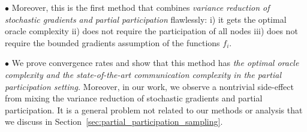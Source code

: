 \documentclass{article}
\begin{document}
$\bullet$ Moreover, this is the first method that combines \textit{variance reduction of stochastic gradients and partial participation} flawlessly: i) it gets the optimal oracle complexity ii) does not require the participation of all nodes iii) does not require the bounded gradients assumption of the functions $f_i$.

$\bullet$ We prove convergence rates and show that this method has \textit{the optimal oracle complexity and the state-of-the-art communication complexity in the partial participation setting.} Moreover, in our work, we observe a nontrivial side-effect from mixing the variance reduction of stochastic gradients and partial participation. It is a general problem not related to our methods or analysis that we discuss in Section~\ref{sec:partial_participation_sampling}.
\end{document}
